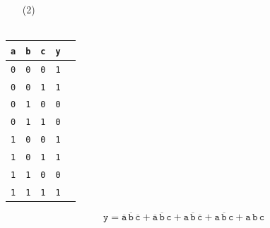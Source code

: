 \documentclass[mathserif, handout]{beamer}
\newcommand{\ttab}[1]{\texttt{#1}}
\begin{document}
\begin{frame}
    
\begin{itemize}
    \item[(2)]  \\
       \\[2mm]
\end{itemize}
  \begin{center}
    \renewcommand{\arraystretch}{1.15}
    \begin{tabular}{ccc|cl}
      \ttab{a} & \ttab{b} & \ttab{c} & \ttab{y} \\ \hline
      \ttab{0} & \ttab{0} & \ttab{0} & \ttab{1} \\
      \ttab{0} & \ttab{0} & \ttab{1} & \ttab{1} \\
      \ttab{0} & \ttab{1} & \ttab{0} & \ttab{0} \\
      \ttab{0} & \ttab{1} & \ttab{1} & \ttab{0} \\
      \ttab{1} & \ttab{0} & \ttab{0} & \ttab{1} \\
      \ttab{1} & \ttab{0} & \ttab{1} & \ttab{1} \\
      \ttab{1} & \ttab{1} & \ttab{0} & \ttab{0} \\
      \ttab{1} & \ttab{1} & \ttab{1} & \ttab{1} \\
    \end{tabular}
  \end{center}
\begin{center}\vspace{-2mm}
\vspace{-2mm}
\end{center}
\[\ttab{y} = \overline{\ttab{a}}\,\overline{\ttab{b}}\,\overline{\ttab{c}} + \overline{\ttab{a}}\,\overline{\ttab{b}}\,\ttab{c} + \ttab{a}\,\overline{\ttab{b}}\,\overline{\ttab{c}} + \ttab{a}\,\overline{\ttab{b}}\,\ttab{c} + \ttab{a}\,\ttab{b}\,\ttab{c}\]
\end{frame}
\end{document}
